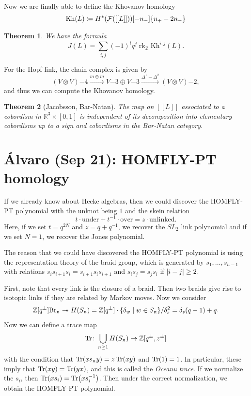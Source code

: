 \documentclass[leqno, openany]{memoir}
\newtheorem{thm}{Theorem}[section]
\theoremstyle{definition}
\theoremstyle{remark}
\theoremstyle{plain}
\theoremstyle{definition}
\theoremstyle{remark}
\newcommand{\R}{\mathbb{R}}
\newcommand{\Z}{\mathbb{Z}}
\newcommand{\mc}[1]{\mathcal{#1}}
\newcommand{\mr}[1]{\mathrm{#1}}
\newcommand{\1}{\mathbf{1}}
\newcommand{\2}{\mathbf{2}}
\newcommand{\3}{\mathbf{3}}
\DeclareMathOperator{\rk}{rk}
\begin{document}
Now we are finally able to define the Khovanov homology
\[ \mr{Kh}(L) \coloneqq H^*(\mc{F}([[L]]))[-n_-]\qty{n_+ - 2n_-} \]

\begin{thm}
    We have the formula
    \[ J(L) = \sum_{i,j} {(-1)}^i q^j \rk_{\Z} \mr{ Kh }^{i,j}(L). \]
\end{thm}

For the Hopf link, the chain complex is given by
\[ (V \otimes V)\qty{-4} \xrightarrow{m \oplus m} V \qty{-3} \oplus V\qty{-3} \xrightarrow{\Delta^1 - \Delta^2} (V \otimes V) \qty{-2}, \]
and thus we can compute the Khovanov homology.

\begin{thm}[Jacobsson, Bar-Natan]
    The map on $[[L]]$ associated to a cobordism in $\R^3 \times [0,1]$ is independent of its decomposition into elementary cobordisms up to a sign and cobordisms in the Bar-Natan category.
\end{thm}

\chapter{\'Alvaro (Sep 21): HOMFLY-PT homology}%
\label{cha:'alvaro_sep_21_homfly_pt_homology}

If we already know about Hecke algebras, then we could discover the HOMFLY-PT polynomial with the unknot being $1$ and the skein relation
\[ t \cdot \text{under} + t^{-1} \cdot \text{over} = z \cdot \text{unlinked}. \]
Here, if we set $t = q^{2N}$ and $z = q + q^{-1}$, we recover the $SL_2$ link polynomial and if we set $N = 1$, we recover the Jones polynomial.

The reason that we could have discovered the HOMFLY-PT polynomial is using the representation theory of the braid group, which is generated by $s_1, \ldots, s_{n-1}$ with relations $s_i s_{i+1} s_i = s_{i+1} s_i s_{i+1}$ and $s_i s_j = s_j s_i$ if $\abs{i-j} \geq 2$.

First, note that every link is the closure of a braid. Then two braids give rise to isotopic links if they are related by Markov moves. Now we consider
\[ \Z[q^{\pm}] \mr{Br}_n \twoheadrightarrow H(S_n) = \Z[q^{\pm}] \cdot \qty{\delta_w \mid w \in S_n} / \delta_s^2 = \delta_s (q-1) + q. \]
Now we can define a trace map
\[ \Tr \colon \bigcup_{n \geq 1} H(S_n) \to \Z[q^{\pm}, z^{\pm}] \]
with the condition that $\Tr(x s_n y) = z \Tr(xy)$ and $\Tr(1) = 1$. In particular, these imply that $\Tr(xy) = \Tr(yx)$, and this is called the \textit{Oceanu trace}. If we normalize the $s_i$, then $\Tr(x s_i) = \Tr(x s_i^{-1})$. Then under the correct normalization, we obtain the HOMFLY-PT polynomial.
\end{document}
